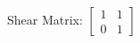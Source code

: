 \documentclass[preview]{standalone}
\begin{document}
\begin{center}
Shear Matrix: $\begin{bmatrix} 1 & 1 \\ 0 & 1 \end{bmatrix}$
\end{center}
\end{document}
